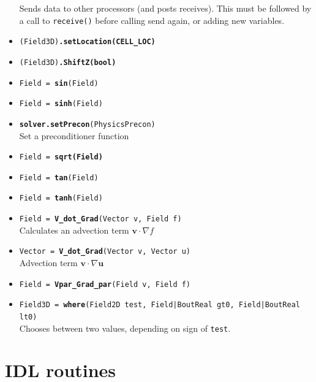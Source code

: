 \documentclass[12pt]{article}
\newcommand{\code}[1]{\texttt{#1}}
\begin{document}
\begin{itemize}
    Sends data to other processors (and posts receives). This must be followed
    by a call to \code{receive()} before calling send again, or adding new variables.
  \item \texttt{(Field3D)\bf{.setLocation}(CELL\_LOC)}
  \item \texttt{(Field3D)\bf{.ShiftZ}(bool)}
  \item \texttt{Field = {\bf{sin}}(Field)}
  \item \texttt{Field = {\bf{sinh}}(Field)}
  \item \texttt{{\bf solver.setPrecon}(PhysicsPrecon)} \\
    Set a preconditioner function
  \item \texttt{Field = \bf{sqrt}(Field)}
  \item \texttt{Field = {\bf tan}(Field)}
  \item \texttt{Field = {\bf tanh}(Field)}
  \item \texttt{Field = {\bf V\_dot\_Grad}(Vector v, Field f)} \\
    Calculates an advection term $\mathbf{v}\cdot\nabla f$
  \item \texttt{Vector = {\bf V\_dot\_Grad}(Vector v, Vector u)} \\
    Advection term $\mathbf{v}\cdot\nabla\mathbf{u}$
  \item \texttt{Field = {\bf Vpar\_Grad\_par}(Field v, Field f)}
  \item \texttt{Field3D = {\bf where}(Field2D test, Field|BoutReal gt0, Field|BoutReal lt0)} \\
    Chooses between two values, depending on sign of \code{test}.
\end{itemize}

\section{IDL routines}
\label{apx:idl_routines}
\end{document}
